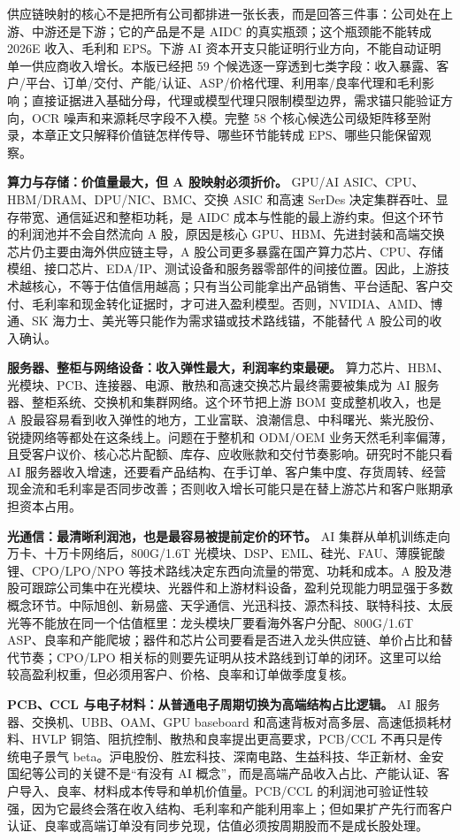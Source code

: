 供应链映射的核心不是把所有公司都排进一张长表，而是回答三件事：公司处在上游、中游还是下游；它的产品是不是 AIDC 的真实瓶颈；这个瓶颈能不能转成 2026E 收入、毛利和 EPS。下游 AI 资本开支只能证明行业方向，不能自动证明单一供应商收入增长。本版已经把 59 个候选逐一穿透到七类字段：收入暴露、客户/平台、订单/交付、产能/认证、ASP/价格代理、利用率/良率代理和毛利影响；直接证据进入基础分母，代理或模型代理只限制模型边界，需求锚只能验证方向，OCR 噪声和来源耗尽字段不入模。完整 58 个核心候选公司级矩阵移至附录，本章正文只解释价值链怎样传导、哪些环节能转成 EPS、哪些只能保留观察。

\textbf{算力与存储：价值量最大，但 A 股映射必须折价。} GPU/AI ASIC、CPU、HBM/DRAM、DPU/NIC、BMC、交换 ASIC 和高速 SerDes 决定集群吞吐、显存带宽、通信延迟和整柜功耗，是 AIDC 成本与性能的最上游约束。但这个环节的利润池并不会自然流向 A 股，原因是核心 GPU、HBM、先进封装和高端交换芯片仍主要由海外供应链主导，A 股公司更多暴露在国产算力芯片、CPU、存储模组、接口芯片、EDA/IP、测试设备和服务器零部件的间接位置。因此，上游技术越核心，不等于估值信用越高；只有当公司能拿出产品销售、平台适配、客户交付、毛利率和现金转化证据时，才可进入盈利模型。否则，NVIDIA、AMD、博通、SK 海力士、美光等只能作为需求锚或技术路线锚，不能替代 A 股公司的收入确认。

\textbf{服务器、整柜与网络设备：收入弹性最大，利润率约束最硬。} 算力芯片、HBM、光模块、PCB、连接器、电源、散热和高速交换芯片最终需要被集成为 AI 服务器、整柜系统、交换机和集群网络。这个环节把上游 BOM 变成整机收入，也是 A 股最容易看到收入弹性的地方，工业富联、浪潮信息、中科曙光、紫光股份、锐捷网络等都处在这条线上。问题在于整机和 ODM/OEM 业务天然毛利率偏薄，且受客户议价、核心芯片配额、库存、应收账款和交付节奏影响。研究时不能只看 AI 服务器收入增速，还要看产品结构、在手订单、客户集中度、存货周转、经营现金流和毛利率是否同步改善；否则收入增长可能只是在替上游芯片和客户账期承担资本占用。

\textbf{光通信：最清晰利润池，也是最容易被提前定价的环节。} AI 集群从单机训练走向万卡、十万卡网络后，800G/1.6T 光模块、DSP、EML、硅光、FAU、薄膜铌酸锂、CPO/LPO/NPO 等技术路线决定东西向流量的带宽、功耗和成本。A 股及港股可跟踪公司集中在光模块、光器件和上游材料设备，盈利兑现能力明显强于多数概念环节。中际旭创、新易盛、天孚通信、光迅科技、源杰科技、联特科技、太辰光等不能放在同一个估值框里：龙头模块厂要看海外客户分配、800G/1.6T ASP、良率和产能爬坡；器件和芯片公司要看是否进入龙头供应链、单价占比和替代节奏；CPO/LPO 相关标的则要先证明从技术路线到订单的闭环。这里可以给较高盈利权重，但必须用客户、价格、良率和订单做季度复核。

\textbf{PCB、CCL 与电子材料：从普通电子周期切换为高端结构占比逻辑。} AI 服务器、交换机、UBB、OAM、GPU baseboard 和高速背板对高多层、高速低损耗材料、HVLP 铜箔、阻抗控制、散热和良率提出更高要求，PCB/CCL 不再只是传统电子景气 beta。沪电股份、胜宏科技、深南电路、生益科技、华正新材、金安国纪等公司的关键不是“有没有 AI 概念”，而是高端产品收入占比、产能认证、客户导入、良率、材料成本传导和单机价值量。PCB/CCL 的利润池可验证性较强，因为它最终会落在收入结构、毛利率和产能利用率上；但如果扩产先行而客户认证、良率或高端订单没有同步兑现，估值必须按周期股而不是成长股处理。


